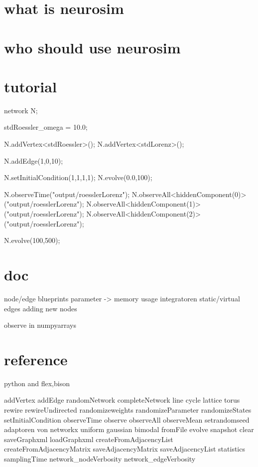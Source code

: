 



\section{what is neurosim}



\section{who should use neurosim}

\section{tutorial}

network N;

stdRoessler_omega = 10.0;

N.addVertex<stdRoessler>();
N.addVertex<stdLorenz>();

N.addEdge(1,0,10);


N.setInitialCondition(1,1,1,1);
N.evolve(0.0,100);

N.observeTime("output/roesslerLorenz");
N.observeAll<hiddenComponent(0)>("output/roesslerLorenz");
N.observeAll<hiddenComponent(1)>("output/roesslerLorenz");
N.observeAll<hiddenComponent(2)>("output/roesslerLorenz");

N.evolve(100,500);


\section{doc}

node/edge blueprints
parameter -> memory usage
integratoren
static/virtual edges
adding new nodes


observe in numpyarrays




\section{reference}


python and flex,bison


addVertex
addEdge
randomNetwork
completeNetwork
line
cycle
lattice
torus
rewire
rewireUndirected
randomizeweights
randomizeParameter
randomizeStates
setInitialCondition
observeTime
observe
observeAll
observeMean
setrandomseed
adaptoren von networkx
uniform
gaussian
bimodal
fromFile
evolve
snapshot
clear
saveGraphxml
loadGraphxml
createFromAdjacencyList
createFromAdjacencyMatrix
saveAdjacencyMatrix
saveAdjacencyList
statistics
samplingTime
network_nodeVerbosity
network_edgeVerbosity







